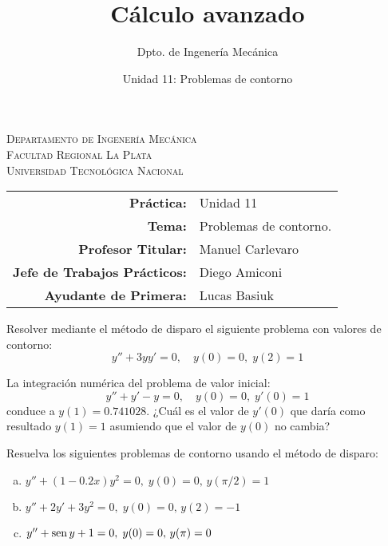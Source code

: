 \documentclass[11pt]{article}
\title{Cálculo avanzado}
\author{Dpto. de Ingenería Mecánica}
\date{Unidad 11: Problemas de contorno}
\begin{document}

\begin{center}
\end{center} 

\begin{center}
\vspace{\baselineskip}
\Large{\textsc{Departamento de Ingenería Mecánica}} \\
\textsc{Facultad Regional La Plata} \\
\textsc{Universidad Tecnológica Nacional}
\end{center}


\begin{center}
\begin{tabular}{r l}
    \textbf{Práctica:} & Unidad 11 \\
 \textbf{Tema:} & Problemas de contorno. \\
 \textbf{Profesor Titular:} & Manuel Carlevaro \\
 \textbf{Jefe de Trabajos Prácticos:} & Diego Amiconi \\
 \textbf{Ayudante de Primera:} & Lucas Basiuk 
\end{tabular}\end{center}

\vspace{1em}

\begin{question} %
Resolver mediante el método de disparo el siguiente problema con valores de contorno:
\[ y'' + 3 y y' = 0, \quad y(0) = 0, \; y(2) = 1 \]
\end{question}

\begin{question} %
La integración numérica del problema de valor inicial:
\[ y'' + y' -y = 0, \quad y(0) = 0, \; y'(0) = 1 \]
conduce a $y(1) = 0.741028$. ¿Cuál es el valor de $y'(0)$ que daría como resultado $y(1) = 1$ asumiendo que el valor de $y(0)$ no cambia?
\end{question}

\begin{question} %
Resuelva los siguientes problemas de contorno usando el método de disparo:
\begin{enumerate}[a)]
    \item $y'' + (1 - 0.2 x) y^2 = 0, \; y(0) = 0, \, y(\pi/2) = 1$
    \item $y'' + 2 y' + 3 y^2 = 0, \; y(0) = 0, \, y(2) = -1$
    \item $y'' + \operatorname{sen} y + 1 = 0, \; y(0) = 0, \, y(\pi) = 0$
\end{enumerate}
\end{question}
\end{document}
